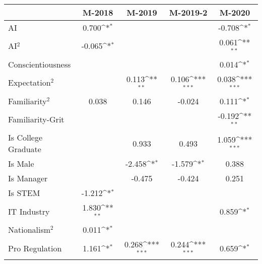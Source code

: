 {
\def\sym#1{\ifmmode^{#1}\else\(^{#1}\)\fi}
\begin{tabular}{l*{4}{c}}
    \toprule
                        & M-2018        & M-2019         & M-2019-2       & M-2020                 \\
    \midrule
    AI                  & 0.700\sym{*}  &                &                & -0.708\sym{*}          \\
    \addlinespace
    AI$^2$              & -0.065\sym{*} &                &                & 0.061\sym{**}          \\
    \addlinespace
    Conscientiousness   &               &                &                & 0.014\sym{*}           \\
    \addlinespace
    Expectation$^2$     &               & 0.113\sym{**}  & 0.106\sym{***} & 0.038\sym{***}         \\
    \addlinespace
    Familiarity$^2$     & 0.038         & 0.146          & -0.024         & 0.111\sym{*}           \\
    \addlinespace
    Familiarity-Grit    &               &                &                & -0.192\sym{**}         \\
    \addlinespace
    Is College Graduate &               & 0.933          & 0.493          & 1.059\sym{***}         \\
    \addlinespace
    Is Male             &               & -2.458\sym{*}  & -1.579\sym{*}  & 0.388                  \\
    \addlinespace
    Is Manager          &               & -0.475         & -0.424         & 0.251                  \\
    \addlinespace
    Is STEM             & -1.212\sym{*} &                &                &                        \\
    \addlinespace
    IT Industry         & 1.830\sym{**} &                &                & 0.859\sym{*}           \\
    \addlinespace
    Nationalism$^2$     & 0.011\sym{*}  &                &                &                        \\
    \addlinespace
    Pro Regulation      & 1.161\sym{*}  & 0.268\sym{***} & 0.244\sym{***} & 0.659\sym{*}           \\

\end{tabular}}
